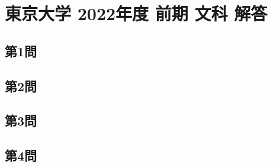 ﻿\documentclass[../../uem_tok_a.tex]{subfiles}
\begin{document}
    \section{東京大学 2022年度 前期 文科 解答}

    \subsection{第1問}
    

    \clearpage
    \subsection{第2問}
    

    \clearpage
    \subsection{第3問}
    

    \clearpage
    \subsection{第4問}
    

    \clearpage
\end{document}

